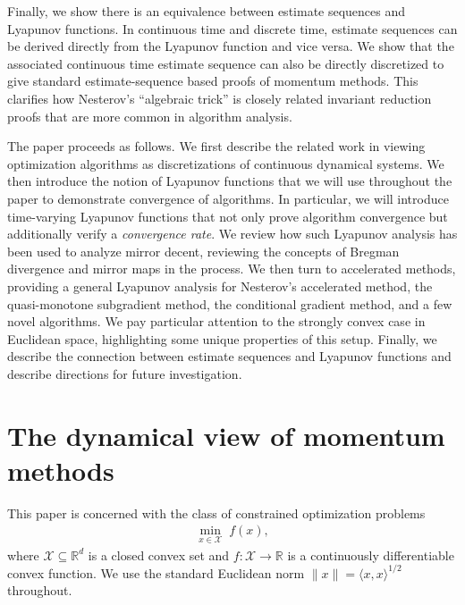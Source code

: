 \documentclass[11pt]{article}
\theoremstyle{plain}
\newcommand{\R}{{\mathbb R}}
\newcommand{\X}{{\mathcal X}}
\begin{document}
Finally, we show there is an equivalence between estimate sequences and Lyapunov functions.  In continuous time and discrete time, estimate sequences can be derived directly from the Lyapunov function and vice versa.  We show that the associated continuous time estimate sequence can also be directly discretized to give standard estimate-sequence based proofs of momentum methods.  This clarifies how Nesterov's ``algebraic trick'' is closely related invariant reduction proofs that are more common in algorithm analysis.

The paper proceeds as follows.  We first describe the related work in viewing optimization algorithms as discretizations of continuous dynamical systems.  We then introduce the notion of Lyapunov functions that we will use throughout the paper to demonstrate convergence of algorithms.  In particular, we will introduce time-varying Lyapunov functions that not only prove algorithm convergence but additionally verify a \emph{convergence rate}.  We review how such Lyapunov analysis has been used to analyze mirror decent, reviewing the concepts of Bregman divergence and mirror maps in the process.  We then turn to accelerated methods, providing a general Lyapunov analysis for Nesterov's accelerated method, the quasi-monotone subgradient method, the conditional gradient method, and a few novel algorithms.  We pay particular attention to the strongly convex case in Euclidean space, highlighting some unique properties of this setup.  Finally, we describe the connection between estimate sequences and Lyapunov functions and describe directions for future investigation.

\section{The dynamical view of momentum methods}


This paper is concerned with the class of constrained optimization problems
\begin{align}\label{eq:main-problem}
\min_{x \in \X} \; f(x),
\end{align}
where $\X \subseteq \R^d$ is a closed convex set and $f \colon \X \to \R$ is a continuously differentiable convex function. 
We use the standard Euclidean norm $\|x\| = \langle x,x \rangle^{1/2}$ throughout.
\end{document}

